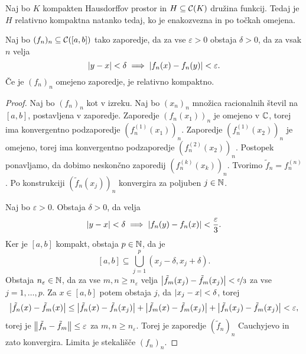 \begin{izrek}
  Naj bo $K$ kompakten Hausdorffov prostor in $H \subseteq \mathcal{C}(K)$ družina
  funkcij.
  Tedaj je $H$ relativno kompaktna natanko tedaj, ko je enakozvezna in po točkah
  omejena.
\end{izrek}


\begin{izrek}
  Naj bo $(f_n)_n \subseteq \mathcal{C}([a,b])$ tako zaporedje, da za vse
  $\varepsilon > 0$ obstaja $\delta > 0$, da za vsak $n$ velja
  \[
	\left| y-x \right| < \delta \implies \left| f_n(x) - f_n(y) \right| < \varepsilon.
  \]
  Če je $(f_n)_n$ omejeno zaporedje, je relativno kompaktno.
\end{izrek}

\begin{proof}
  Naj bo $(f_n)_n$ kot v izreku.
  Naj bo $(x_n)_n$ množica racionalnih števil na $[a,b]$, postavljena v
  zaporedje.
  Zaporedje $(f_n(x_1))_n$ je omejeno v $\mathbb{C}$, torej ima konvergentno
  podzaporedje $(f_n^{(1)}(x_1))_n$.
  Zaporedje $(f_n^{(1)}(x_2))_n$ je omejeno, torej ima konvergentno podzaporedje
  $(f_n^{(2)}(x_2))_n$.
  Postopek ponavljamo, da dobimo neskončno zaporedij $(f_n^{(k)}(x_k))_n$.
  Tvorimo $\tilde{f}_n = f_n^{(n)}$.
  Po konstrukciji $(\tilde{f}_n(x_j))_n$ konvergira za poljuben $j \in \mathbb{N}$.

  Naj bo $\varepsilon > 0$.
  Obstaja $\delta > 0$, da velja
  \[
	\left| y-x \right| < \delta \implies \left| f_n(y) - f_n(x) \right| < \frac{\varepsilon}{3}.
  \]
  Ker je $[a,b]$ kompakt, obstaja $p \in \mathbb{N}$, da je
  \[
	[a,b] \subseteq \bigcup_{j=1}^p (x_j - \delta, x_j + \delta).
  \]
  Obstaja $n_\varepsilon \in \mathbb{N}$, da za vse $m,n \ge n_\varepsilon$ velja
  $\left| \tilde{f}_m(x_j) - \tilde{f}_m(x_j) \right| < \nicefrac{\varepsilon}{3}$ za vse
  $j=1, \ldots, p$.
  Za $x \in [a,b]$ potem obstaja $j$, da $\left| x_j -x \right| < \delta$, torej
  \[
	\left| \tilde{f}_n(x) - \tilde{f}_m(x) \right|
	\le \left| \tilde{f}_n(x) - \tilde{f}_n(x_j) \right| + \left| \tilde{f}_m(x) -
	  \tilde{f}_m(x_j) \right| + \left| \tilde{f}_n(x_j) - \tilde{f}_m(x_j) \right| <
	\varepsilon,
  \]
  torej je $\left\lVert\tilde{f}_n - \tilde{f}_m\right\rVert \le \varepsilon$ za $m, n \ge
  n_\varepsilon$.
  Torej je zaporedje $(\tilde{f}_n)_n$ Cauchyjevo in zato konvergira.
  Limita je stekališče $(f_n)_n$.
\end{proof}


